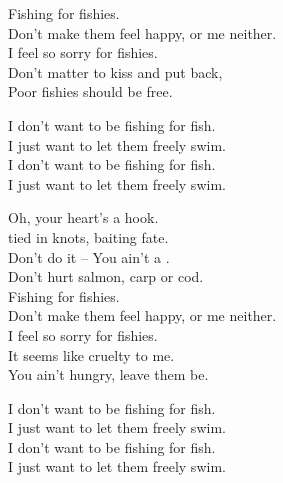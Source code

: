 
\label{album:fishing-for-fishiesp}





Fishing for fishies. \\
Don't make them feel happy, or me neither. \\
I feel so sorry for fishies. \\

Don't matter to kiss and put back, \\
Poor fishies should be free. \\


I don't want to be fishing for fish. \\
I just want to let them freely swim. \\
I don't want to be fishing for fish. \\
I just want to let them freely swim. \\


Oh, your heart's a hook. \\
 tied in knots, baiting fate. \\
Don't do it -- You ain't a . \\
Don't hurt salmon, carp or cod. \\

Fishing for fishies. \\
Don't make them feel happy, or me neither. \\
I feel so sorry for fishies. \\

It seems like cruelty to me. \\
You ain't hungry, leave them be. \\


I don't want to be fishing for fish. \\
I just want to let them freely swim. \\
I don't want to be fishing for fish. \\
I just want to let them freely swim. \\

